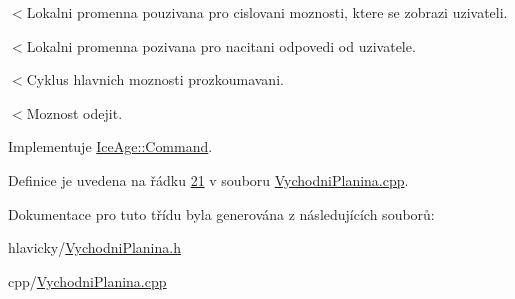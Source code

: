 $<$Lokalni promenna pouzivana pro cislovani moznosti, ktere se zobrazi uzivateli.

$<$Lokalni promenna pozivana pro nacitani odpovedi od uzivatele.

$<$Cyklus hlavnich moznosti prozkoumavani.

$<$Moznost odejit. 

Implementuje \hyperlink{classIceAge_1_1Command_a0466e88c0c9e2a44618c12f6c88b76fe}{Ice\+Age\+::\+Command}.



Definice je uvedena na řádku \hyperlink{VychodniPlanina_8cpp_source_l00021}{21} v souboru \hyperlink{VychodniPlanina_8cpp_source}{Vychodni\+Planina.\+cpp}.



Dokumentace pro tuto třídu byla generována z následujících souborů\+:\begin{DoxyCompactItemize}
\item 
hlavicky/\hyperlink{VychodniPlanina_8h}{Vychodni\+Planina.\+h}\item 
cpp/\hyperlink{VychodniPlanina_8cpp}{Vychodni\+Planina.\+cpp}\end{DoxyCompactItemize}
